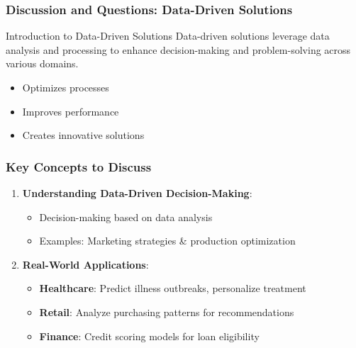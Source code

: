 \documentclass[aspectratio=169]{beamer}
\begin{document}
\begin{frame}[fragile]
    \frametitle{Discussion and Questions: Data-Driven Solutions}
    \begin{block}{Introduction to Data-Driven Solutions}
        Data-driven solutions leverage data analysis and processing to enhance decision-making and problem-solving across various domains.
    \end{block}
    
    \begin{itemize}
        \item Optimizes processes
        \item Improves performance
        \item Creates innovative solutions
    \end{itemize}
\end{frame}

\begin{frame}[fragile]
    \frametitle{Key Concepts to Discuss}
    \begin{enumerate}
        \item \textbf{Understanding Data-Driven Decision-Making}:
            \begin{itemize}
                \item Decision-making based on data analysis
                \item Examples: Marketing strategies \& production optimization
            \end{itemize}

        \item \textbf{Real-World Applications}:
            \begin{itemize}
                \item \textbf{Healthcare}: Predict illness outbreaks, personalize treatment
                \item \textbf{Retail}: Analyze purchasing patterns for recommendations
                \item \textbf{Finance}: Credit scoring models for loan eligibility
            \end{itemize}
    \end{enumerate}
\end{frame}
\end{document}

